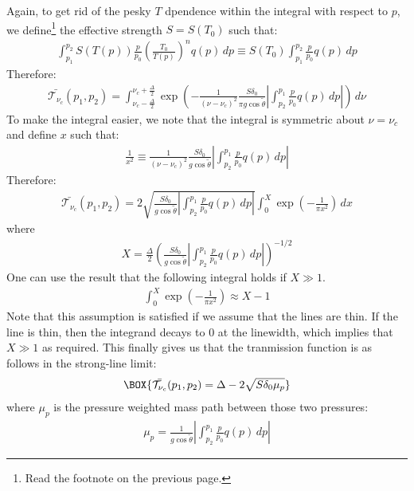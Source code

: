 Again, to get rid of the pesky $T$ dpendence within the integral with respect to $p$, we define\footnote{Read the footnote on the previous page.} the effective strength $S=S(T_0)$ such that:
\begin{align*}
    \int_{p_1}^{p_2}S(T(p))\frac{p}{p_0} \left( \frac{T_0}{T(p)} \right)^nq(p)\,dp\equiv
    S(T_0)\int_{p_1}^{p_2}\frac{p}{p_0} q(p)\,dp
\end{align*}
Therefore:
\begin{align*}
    \bar{\mathcal{T}_{\nu_c}}(p_1,p_2)
    =
    \int_{\nu_c-\frac{\Delta}{2}}^{\nu_c+\frac{\Delta}{2}} \exp\left(
        -\frac{1}{(\nu-\nu_c)^2}
        \frac{S\delta_0}{\pi g \cos \tilde{\theta}}
        \left|
            \int_{p_2}^{p_1}\frac{p}{p_0} q(p)\,dp
        \right|
    \right)\,d\nu
\end{align*}
To make the integral easier, we note that the integral is symmetric about $\nu=\nu_c$ and define $x$ such that:
\begin{align*}
    \frac{1}{x^2}\equiv\frac{1}{(\nu-\nu_c)^2}
        \frac{S\delta_0}{g \cos \tilde{\theta}}
        \left|
            \int_{p_2}^{p_1}\frac{p}{p_0} q(p)\,dp
        \right|
\end{align*}
Therefore:
\begin{align*}
    \bar{\mathcal{T}_{\nu_c}}(p_1,p_2)
    =2
    \sqrt{\frac{S\delta_0}{g \cos \tilde{\theta}}
        \left|
            \int_{p_2}^{p_1}\frac{p}{p_0} q(p)\,dp
        \right|}
    \int_{0}^{X} \exp\left(
        -\frac{1}{\pi x^2}
    \right)\,dx
\end{align*}
where
\begin{align*}
    X=\frac{\Delta}{2}\left(\frac{S\delta_0}{g \cos \tilde{\theta}}
        \left|
            \int_{p_2}^{p_1}\frac{p}{p_0} q(p)\,dp
        \right|\right)^{-1/2}
\end{align*}
One can use the result that the following integral holds if $X\gg 1$. 
\begin{align*}
    \int_{0}^{X}\exp\left( -\frac{1}{\pi x^2} \right)\approx X-1
\end{align*}
Note that this assumption is satisfied if we assume that the lines are thin. If the line is thin, then the integrand decays to $0$ at the linewidth, which implies that $X\gg 1$ as required. This finally gives us that the tranmission function is as follows in the strong-line limit:
\begin{align}
    \BOX{
        \bar{\mathcal{T}_{\nu_c}}(p_1,p_2)
        =
        \Delta
        -
        2\sqrt{S\delta_0 \mu_p}
    }
\end{align}
where $\mu_p$ is the pressure weighted mass path between those two pressures:
\begin{align*}
    \mu_p=\frac{1}{g\cos\tilde{\theta}}\left|
            \int_{p_2}^{p_1}\frac{p}{p_0} q(p)\,dp
        \right|
\end{align*}

